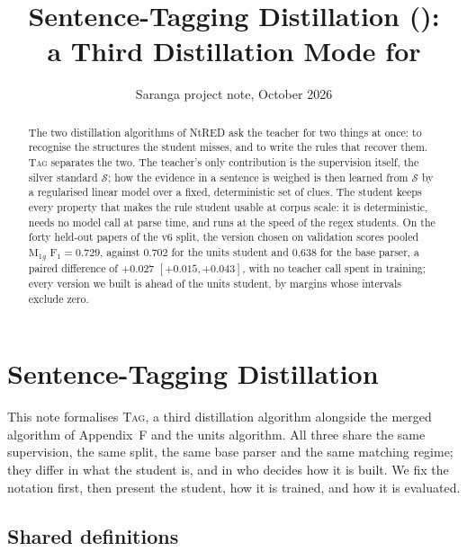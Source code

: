 \documentclass[10pt]{article}
\title{Sentence-Tagging Distillation (\tagger{}):\\ a Third Distillation Mode for \nerd{}}
\author{Saranga project note, October 2026}
\newcommand{\nerd}{NtRED}
\newcommand{\tagger}{\textsc{Tag}}
\begin{document}
\maketitle

\begin{abstract}
The two distillation algorithms of \nerd{} ask the teacher for two things at once: to recognise the structures the student misses, and to write the rules that recover them. \tagger{} separates the two. The teacher's only contribution is the supervision itself, the silver standard $\mathcal{S}$; how the evidence in a sentence is weighed is then learned from $\mathcal{S}$ by a regularised linear model over a fixed, deterministic set of clues. The student keeps every property that makes the rule student usable at corpus scale: it is deterministic, needs no model call at parse time, and runs at the speed of the regex students. On the forty held-out papers of the v6 split, the version chosen on validation scores pooled $\mathrm{M}_{1g}$ $\mathrm{F}_1=0.729$, against $0.702$ for the units student and $0.638$ for the base parser, a paired difference of $+0.027$ $[+0.015,+0.043]$, with no teacher call spent in training; every version we built is ahead of the units student, by margins whose intervals exclude zero.
\end{abstract}

\section{Sentence-Tagging Distillation}
\label{app:tagger}

This note formalises \tagger{}, a third distillation algorithm alongside the merged algorithm of Appendix~F and the units algorithm. All three share the same supervision, the same split, the same base parser and the same matching regime; they differ in what the student is, and in who decides how it is built. We fix the notation first, then present the student, how it is trained, and how it is evaluated.

\subsection{Shared definitions}
\end{document}
